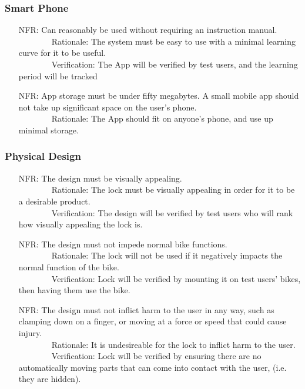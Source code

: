 \documentclass[12pt]{article}
\newcounter{nfrnum} %
\begin{document}
\subsubsection{Smart Phone}
\begin{itemize}
\setlength{\itemindent}{.5in}
\item[NFR\refstepcounter{nfrnum}\thenfrnum\label{NFRInst}:] Can reasonably be used without requiring an instruction manual.
\\ \-\ \-\ \-\ \-\ \-\ \-\ \-\ \-\ Rationale: The system must be easy to use with a minimal learning curve for it to be useful.
\\ \-\ \-\ \-\ \-\ \-\ \-\ \-\ \-\ Verification: The App will be verified by test users, and the learning period will be tracked
\item[NFR\refstepcounter{nfrnum}\thenfrnum\label{NFRStor}:] App storage must be under fifty megabytes. A small mobile app should not take up significant space on the user's phone.
\\ \-\ \-\ \-\ \-\ \-\ \-\ \-\ \-\ Rationale: The App should fit on anyone's phone, and use up minimal storage.
\end{itemize}

\subsubsection{Physical Design}
\begin{itemize}
\setlength{\itemindent}{.5in}
\item[NFR\refstepcounter{nfrnum}\thenfrnum\label{NFRVisual}:] The design must be visually appealing.
\\ \-\ \-\ \-\ \-\ \-\ \-\ \-\ \-\ Rationale: The lock must be visually appealing in order for it to be a desirable product.
\\ \-\ \-\ \-\ \-\ \-\ \-\ \-\ \-\ Verification: The design will be verified by test users who will rank how visually  appealing the lock is.
\item[NFR\refstepcounter{nfrnum}\thenfrnum\label{NFRFunc}:] The design must not impede normal bike functions.
\\ \-\ \-\ \-\ \-\ \-\ \-\ \-\ \-\ Rationale: The lock will not be used if it negatively impacts the normal function of the bike.
\\ \-\ \-\ \-\ \-\ \-\ \-\ \-\ \-\ Verification: Lock will be verified by mounting it on test users' bikes, then having them use the bike.
\item[NFR\refstepcounter{nfrnum}\thenfrnum\label{NFRHarm}:] The design must not inflict harm to the user in any way, such as clamping down on a finger, or moving at a force or speed that could cause injury. 
\\ \-\ \-\ \-\ \-\ \-\ \-\ \-\ \-\ Rationale: It is undesireable for the lock to inflict harm to the user.
\\ \-\ \-\ \-\ \-\ \-\ \-\ \-\ \-\ Verification: Lock will be verified by ensuring there are no automatically moving parts that can come into contact with the user, (i.e. they are hidden). 

\end{itemize}
\end{document}
